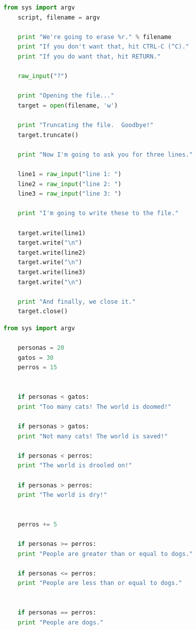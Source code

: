 \documentclass[]{beamer}
\begin{document}
\begin{frame}[fragile]
	\begin{lstlisting}[language=Python, 
	basicstyle=\ttfamily\small, 
	keywordstyle=\color{keywords},
	commentstyle=\color{comments},
	stringstyle=\color{red},
	showstringspaces=false,
	identifierstyle=\color{green},caption= Escribiendo un texto, basicstyle=\tiny]
	from sys import argv
	script, filename = argv
	
	print "We're going to erase %r." % filename
	print "If you don't want that, hit CTRL-C (^C)."
	print "If you do want that, hit RETURN."
	
	raw_input("?")
	
	print "Opening the file..."
	target = open(filename, 'w')
	
	print "Truncating the file.  Goodbye!"
	target.truncate()
	
	print "Now I'm going to ask you for three lines."
	
	line1 = raw_input("line 1: ")
	line2 = raw_input("line 2: ")
	line3 = raw_input("line 3: ")
	
	print "I'm going to write these to the file."
	
	target.write(line1)
	target.write("\n")
	target.write(line2)
	target.write("\n")
	target.write(line3)
	target.write("\n")
	
	print "And finally, we close it."
	target.close()
	\end{lstlisting}
\end{frame}
\begin{frame}[fragile]
	\begin{lstlisting}[language=Python, 
	basicstyle=\ttfamily\small, 
	keywordstyle=\color{keywords},
	commentstyle=\color{comments},
	stringstyle=\color{red},
	showstringspaces=false,
	identifierstyle=\color{green},caption= Condicionales, basicstyle=\tiny]
	from sys import argv
	
	personas = 20
	gatos = 30
	perros = 15
	
	
	if personas < gatos:
	print "Too many cats! The world is doomed!"
	
	if personas > gatos:
	print "Not many cats! The world is saved!"
	
	if personas < perros:
	print "The world is drooled on!"
	
	if personas > perros:
	print "The world is dry!"
	
	
	perros += 5
	
	if personas >= perros:
	print "People are greater than or equal to dogs."
	
	if personas <= perros:
	print "People are less than or equal to dogs."
	
	
	if personas == perros:
	print "People are dogs."
	\end{lstlisting}
\end{frame}
\end{document}
